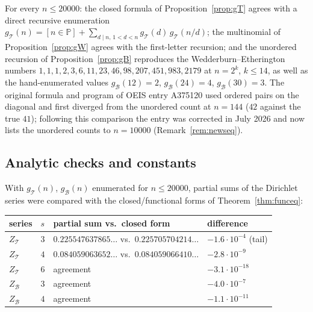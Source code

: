 \documentclass[11pt]{article}
\newcommand{\cT}{\mathcal{T}}   %
\newcommand{\cB}{\mathcal{B}}   %
\numberwithin{equation}{section}
\theoremstyle{plain}
\theoremstyle{definition}
\theoremstyle{remark}
\begin{document}
For every $n \le 20000$: the closed formula of Proposition~\ref{prop:gT} agrees with a
direct recursive enumeration $g_\cT(n) = [n \in \mathbb{P}] + \sum_{d \mid n,\, 1<d<n}
g_\cT(d)\, g_\cT(n/d)$; the multinomial of Proposition~\ref{prop:gW} agrees with the
first-letter recursion; and the unordered recursion of Proposition~\ref{prop:gB}
reproduces the Wedderburn--Etherington numbers
$1,1,1,2,3,6,11,23,46,98,207,451,983,2179$ at $n = 2^k$, $k \le 14$, as well as the
hand-enumerated values $g_\cB(12)=2$, $g_\cB(24)=4$, $g_\cB(30)=3$. The original
formula and program of OEIS entry A375120 used ordered pairs on the diagonal and
first diverged from the unordered count at $n = 144$ ($42$ against the true $41$);
following this comparison the entry was corrected in July 2026 and now lists the
unordered counts to $n = 10000$ (Remark~\ref{rem:newseq}).

\subsection{Analytic checks and constants}

With $g_\cT(n)$, $g_\cB(n)$ enumerated for $n \le 20000$, partial sums of the
Dirichlet series were compared with the closed/functional forms of
Theorem~\ref{thm:funceq}:

\begin{center}\small
\begin{tabular}{@{}llll@{}}
\toprule
series & $s$ & partial sum vs.\ closed form & difference \\
\midrule
$Z_\cT$ & $3$ & $0.225547637865\ldots$ vs.\ $0.225705704214\ldots$ & $-1.6\cdot10^{-4}$ (tail) \\
$Z_\cT$ & $4$ & $0.084059063652\ldots$ vs.\ $0.084059066410\ldots$ & $-2.8\cdot10^{-9}$ \\
$Z_\cT$ & $6$ & agreement & $-3.1\cdot10^{-18}$ \\
$Z_\cB$ & $3$ & agreement & $-4.0\cdot10^{-7}$ \\
$Z_\cB$ & $4$ & agreement & $-1.1\cdot10^{-11}$ \\
\bottomrule
\end{tabular}
\end{center}
\end{document}
